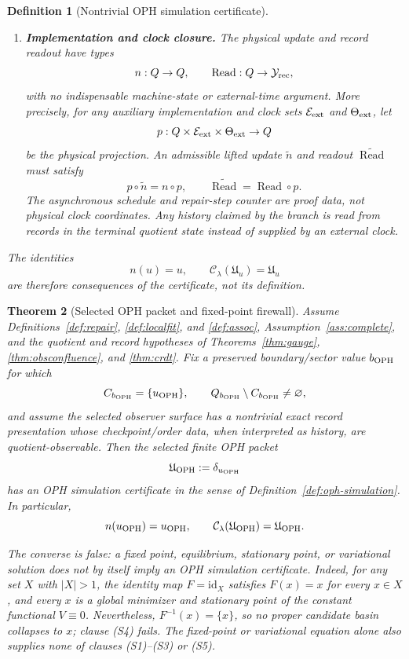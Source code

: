 \documentclass[11pt]{article}
\newtheorem{theorem}{Theorem}[section]
\newtheorem{definition}[theorem]{Definition}
\theoremstyle{remark}
\theoremstyle{plain}
\begin{document}
\begin{definition}[Nontrivial OPH simulation certificate]
\begin{enumerate}[label=(S\arabic*),leftmargin=3.0em]
\item \textbf{Implementation and clock closure.} The physical update and record readout
have types
\[
 n:Q\to Q,
 \qquad
 \operatorname{Read}:Q\to\mathcal Y_{\rm rec},
\]
with no indispensable machine-state or external-time argument. More precisely, for any
auxiliary implementation and clock sets \(\mathcal E_{\rm ext}\) and \(\Theta_{\rm ext}\),
let
\[
 p:Q\times\mathcal E_{\rm ext}\times\Theta_{\rm ext}\to Q
\]
be the physical projection. An admissible lifted update \(\widetilde n\) and readout
\(\widetilde{\operatorname{Read}}\) must satisfy
\[
 p\circ\widetilde n=n\circ p,
 \qquad
 \widetilde{\operatorname{Read}}=\operatorname{Read}\circ p.
\]
The asynchronous schedule and repair-step counter are proof data, not physical clock
coordinates. Any history claimed by the branch is read from records in the terminal quotient
state instead of supplied by an external clock.
\end{enumerate}
The identities
\[
 n(u)=u,
 \qquad
 \mathcal C_\lambda(\mathfrak U_u)=\mathfrak U_u
\]
are therefore consequences of the certificate, not its definition.
\end{definition}

\begin{theorem}[Selected OPH packet and fixed-point firewall]\label{thm:oph-simulation}
Assume Definitions~\ref{def:repair}, \ref{def:localfit}, and \ref{def:assoc},
Assumption~\ref{ass:complete}, and the quotient and record hypotheses of
Theorems~\ref{thm:gauge}, \ref{thm:obsconfluence}, and \ref{thm:crdt}. Fix a preserved
boundary/sector value \(b_{\rm OPH}\) for which
\[
 C_{b_{\rm OPH}}=\{u_{\rm OPH}\},
 \qquad
 Q_{b_{\rm OPH}}\setminus C_{b_{\rm OPH}}\ne\varnothing,
\]
and assume the selected observer surface has a nontrivial exact record presentation whose
checkpoint/order data, when interpreted as history, are quotient-observable. Then the selected
finite OPH packet
\[
 \mathfrak U_{\rm OPH}:=\delta_{u_{\rm OPH}}
\]
has an OPH simulation certificate in the sense of Definition~\ref{def:oph-simulation}. In
particular,
\[
 n(u_{\rm OPH})=u_{\rm OPH},
 \qquad
 \mathcal C_\lambda(\mathfrak U_{\rm OPH})=\mathfrak U_{\rm OPH}.
\]

The converse is false: a fixed point, equilibrium, stationary point, or variational solution
does not by itself imply an OPH simulation certificate. Indeed, for any set \(X\) with
\(|X|>1\), the identity map \(F=\mathrm{id}_X\) satisfies \(F(x)=x\) for every \(x\in X\),
and every \(x\) is a global minimizer and stationary point of the constant functional
\(V\equiv0\). Nevertheless, \(F^{-1}(x)=\{x\}\), so no proper candidate basin collapses to
\(x\); clause \emph{(S4)} fails. The fixed-point or variational equation alone also supplies
none of clauses \emph{(S1)}--\emph{(S3)} or \emph{(S5)}.
\end{theorem}
\end{document}
